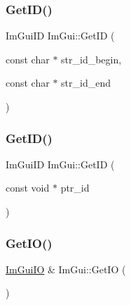 \hypertarget{namespace_im_gui_a26064d74efebef3aa86e1a78b3e4c333}{}\label{namespace_im_gui_a26064d74efebef3aa86e1a78b3e4c333} 
\subsubsection{\texorpdfstring{Get\+I\+D()}{GetID()}\hspace{0.1cm}{\footnotesize\ttfamily [2/3]}}
{\footnotesize\ttfamily Im\+Gui\+ID Im\+Gui\+::\+Get\+ID (\begin{DoxyParamCaption}\item[{const char $\ast$}]{str\+\_\+id\+\_\+begin,  }\item[{const char $\ast$}]{str\+\_\+id\+\_\+end }\end{DoxyParamCaption})}

\hypertarget{namespace_im_gui_a220123ad62c2180ded92b2ef91f27c5a}{}\label{namespace_im_gui_a220123ad62c2180ded92b2ef91f27c5a} 
\subsubsection{\texorpdfstring{Get\+I\+D()}{GetID()}\hspace{0.1cm}{\footnotesize\ttfamily [3/3]}}
{\footnotesize\ttfamily Im\+Gui\+ID Im\+Gui\+::\+Get\+ID (\begin{DoxyParamCaption}\item[{const void $\ast$}]{ptr\+\_\+id }\end{DoxyParamCaption})}

\hypertarget{namespace_im_gui_a3179e560812f878f3961ce803a5d9302}{}\label{namespace_im_gui_a3179e560812f878f3961ce803a5d9302} 
\subsubsection{\texorpdfstring{Get\+I\+O()}{GetIO()}}
{\footnotesize\ttfamily \hyperlink{struct_im_gui_i_o}{Im\+Gui\+IO} \& Im\+Gui\+::\+Get\+IO (\begin{DoxyParamCaption}{ }\end{DoxyParamCaption})}

\hypertarget{namespace_im_gui_a3d260209b8dc25a2c942e8cfd1ed0e51}{}\label{namespace_im_gui_a3d260209b8dc25a2c942e8cfd1ed0e51} 
